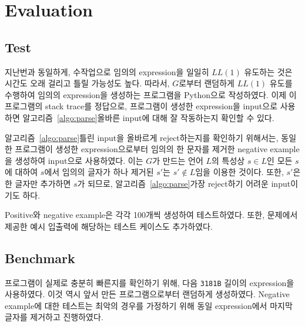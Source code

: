 \documentclass[a4paper,10pt]{scrartcl}
\numberwithin{equation}{section}
\numberwithin{figure}{section}
\numberwithin{table}{section}
\theoremstyle{definition}
\begin{document}
\section{Evaluation}

\subsection{Test}

지난번과 동일하게, 수작업으로 임의의 expression을 일일히 $LL(1)$ 유도하는 것은 시간도 오래 걸리고 틀릴 가능성도 높다. 따라서, $G$로부터 랜덤하게 $LL(1)$ 유도를 수행하여 임의의 expression을 생성하는 프로그램을 Python으로 작성하였다. 이제 이 프로그램의 stack trace를 정답으로, 프로그램이 생성한 expression을 input으로 사용하면 알고리즘~\ref{algo:parse}\가 올바른 input에 대해 잘 작동하는지 확인할 수 있다.

알고리즘~\ref{algo:parse}\가 틀린 input을 올바르게 reject하는지를 확인하기 위해서는, 동일한 프로그램이 생성한 expression으로부터 임의의 한 문자를 제거한 negative example을 생성하여 input으로 사용하였다. 이는 $G$가 만드는 언어 $L$의 특성상 $s \in L$인 모든 $s$에 대하여 $s$에서 임의의 글자가 하나 제거된 $s'$는 $s' \notin L$임을 이용한 것이다. 또한, $s'$은 한 글자만 추가하면 $s$가 되므로, 알고리즘~\ref{algo:parse}\가 가장 reject하기 어려운 input이기도 하다.

Positive와 negative example은 각각 100개씩 생성하여 테스트하였다. 또한, 문제에서 제공한 예시 입출력에 해당하는 테스트 케이스도 추가하였다.

\subsection{Benchmark}

프로그램이 실제로 충분히 빠른지를 확인하기 위해, 다음 \lstinline{3181B} 길이의 expression을 사용하였다. 이것 역시 앞서 만든 프로그램으로부터 랜덤하게 생성하였다. Negative example에 대한 테스트는 최악의 경우를 가정하기 위해 동일 expression에서 마지막 글자를 제거하고 진행하였다.
\end{document}
